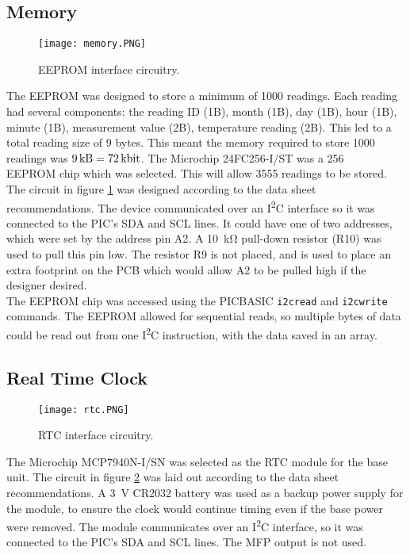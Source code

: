 \subsection{Memory}
\begin{figure}[htbp]
	\centering
	\texttt{[image: memory.PNG]}
	\caption{EEPROM interface circuitry.}
	\label{fig: memory schematic}
\end{figure}

The EEPROM was designed to store a minimum of 1000 readings. Each reading had several components: the reading ID (1B), month (1B), day (1B), hour (1B), minute (1B), measurement value (2B), temperature reading (2B). This led to a total reading size of 9 bytes. This meant the memory required to store 1000 readings was $\SI{9}{\kilo\byte}=\SI{72}{\kilo\bit}$. The Microchip 24FC256-I/ST \cite{memory} was a \SI{256}{\kilo\bit} EEPROM chip which was selected. This will allow 3555 readings to be stored. The circuit in figure \ref{fig: memory schematic} was designed according to the data sheet \cite{memory} recommendations. The device communicated over an I\textsuperscript{2}C interface so it was connected to the PIC's SDA and SCL lines. It could have one of two addresses, which were set by the address pin A2. A \SI{10}{\kilo\ohm} pull-down resistor (R10) was used to pull this pin low. The resistor R9 is not placed, and is used to place an extra footprint on the PCB which would allow A2 to be pulled high if the designer desired.\\

The EEPROM chip was accessed using the PICBASIC \verb|i2cread| and \verb|i2cwrite| commands. The EEPROM allowed for sequential reads, so multiple bytes of data could be read out from one I\textsuperscript{2}C instruction, with the data saved in an array.\\





\subsection{Real Time Clock}
\begin{figure}[htbp]
	\centering
	\texttt{[image: rtc.PNG]}
	\caption{RTC interface circuitry.}
	\label{fig: rtc schematic}
\end{figure}

The Microchip MCP7940N-I/SN \cite{rtc} was selected as the RTC module for the base unit. The circuit in figure \ref{fig: rtc schematic} was laid out according to the data sheet \cite{rtc} recommendations. A \SI{3}{\volt} CR2032 battery was used as a backup power supply for the module, to ensure the clock would continue timing even if the base power were removed. The module communicates over an I\textsuperscript{2}C interface, so it was connected to the PIC's SDA and SCL lines. The MFP output is not used.





